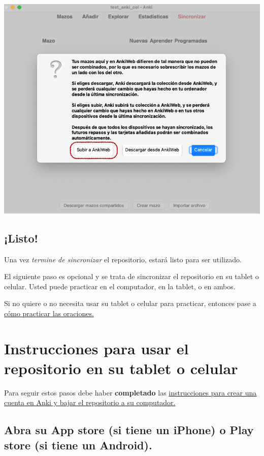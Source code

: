 \documentclass[
]{book}
\begin{document}
\includegraphics[width=0.6\linewidth]{images/reposit_sp/subir_a_anki}

\hypertarget{listo}{%
\section{¡Listo!}\label{listo}}

Una vez \emph{termine de sincronizar} el repositorio, estará listo para ser utilizado.

El siguiente paso es opcional y se trata de sincronizar el repositorio en su tablet o celular. Usted puede practicar en el computador, en la tablet, o en ambos.

Si no quiere o no necesita usar su tablet o celular para practicar, entonces pase a \protect\hyperlink{cross_4}{cómo practicar las oraciones.}

\hypertarget{instrucciones-para-usar-el-repositorio-en-su-tablet-o-celular}{%
\chapter{Instrucciones para usar el repositorio en su tablet o celular}\label{instrucciones-para-usar-el-repositorio-en-su-tablet-o-celular}}

Para seguir estos pasos debe haber \textbf{completado} las \protect\hyperlink{cross_0}{instrucciones para crear una cuenta en Anki y bajar el repositorio a su computador.}

\hypertarget{abra-su-app-store-si-tiene-un-iphone-o-play-store-si-tiene-un-android.}{%
\section{Abra su App store (si tiene un iPhone) o Play store (si tiene un Android).}\label{abra-su-app-store-si-tiene-un-iphone-o-play-store-si-tiene-un-android.}}
\end{document}
